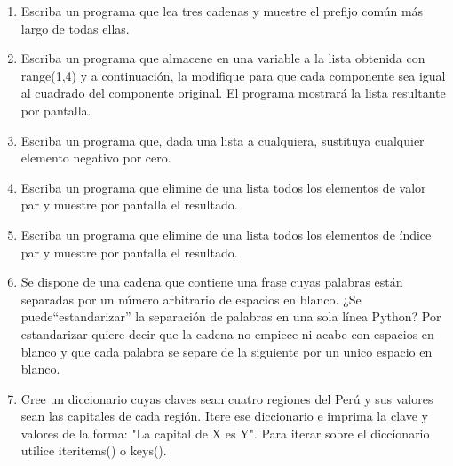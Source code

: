 \begin{enumerate}
\item Escriba un programa que lea tres cadenas y muestre el prefijo común más largo de todas ellas.

\item Escriba un programa que almacene en una variable a la lista obtenida con range(1,4) y a continuación, la modifique para que cada componente sea igual al cuadrado del componente original. El programa mostrará la lista resultante por pantalla.

\item Escriba un programa que, dada una lista a cualquiera, sustituya cualquier elemento negativo por cero.

\item Escriba un programa que elimine de una lista todos los elementos de valor par y muestre por pantalla el resultado.

\item Escriba un programa que elimine de una lista todos los elementos de índice par y muestre por pantalla el resultado.

\item Se dispone de una cadena que contiene una frase cuyas palabras están separadas por un número arbitrario de espacios en blanco. ¿Se puede``estandarizar'' la separación de palabras en una sola línea Python? Por estandarizar quiere decir que la cadena no empiece ni acabe con espacios en blanco y que cada palabra se separe de la siguiente por un unico espacio en blanco.

\item Cree un diccionario cuyas claves sean cuatro regiones del Perú y sus valores sean las capitales de cada región. Itere ese diccionario e imprima la clave y valores de la forma: "La capital de X es Y". Para iterar sobre el diccionario utilice iteritems() o keys().
\end{enumerate}
